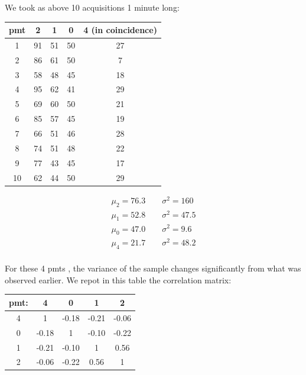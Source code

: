 We took as above 10 acquisitions 1 minute long:

\begin{center}
\begin{tabular}{|c|c|c|c|c|}
\hline 
pmt & 2 & 1 & 0 & 4 (in coincidence) \\ 
\hline 
1 & 91 & 51 & 50 & 27 \\ 
\hline 
2 & 86 & 61 & 50 & 7 \\ 
\hline 
3 & 58 & 48 & 45 & 18 \\ 
\hline 
4 & 95 & 62 & 41 & 29 \\ 
\hline 
5 & 69 & 60 & 50 & 21 \\ 
\hline 
6 & 85 & 57 & 45 & 19 \\ 
\hline 
7 & 66 & 51 & 46 & 28 \\ 
\hline 
8 & 74 & 51 & 48 & 22 \\ 
\hline 
9 & 77 & 43 & 45 & 17 \\ 
\hline 
10 & 62 & 44 & 50 & 29 \\ 
\hline 
\end{tabular} 
\end{center}

\begin{equation*}
\begin{split}
\mu_{2} = 76.3 \qquad \sigma^{2} = 160  \\
\mu_{1} = 52.8 \qquad \sigma^{2} = 47.5 \\
\mu_{0} = 47.0 \qquad \sigma^{2} = 9.6  \\
\mu_{4} = 21.7 \qquad \sigma^{2} = 48.2 \\
\end{split}
\end{equation*}

For these 4 pmts , the variance of the sample changes significantly from what was observed earlier. We repot in this table the correlation matrix:

\begin{center}
\begin{tabular}{|c|c|c|c|c|}
\hline 
pmt: & 4 & 0 & 1 & 2 \\ 
\hline 
4 	 & 1 & -0.18  & -0.21  & -0.06  \\ 
\hline 
0 	 & -0.18  & 1 & -0.10  & -0.22  \\ 
\hline 
1    & -0.21  & -0.10  & 1 & 0.56  \\ 
\hline 
2    & -0.06 & -0.22  & 0.56  & 1 \\ 
\hline 
\end{tabular} 
\end{center}

